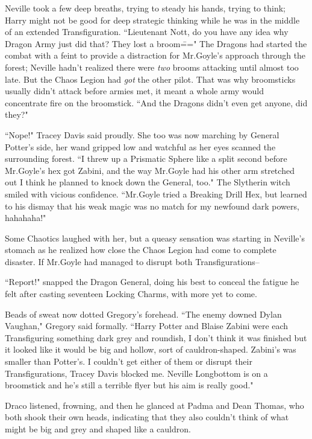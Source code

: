 Neville took a few deep breaths, trying to steady his hands, trying to think; Harry might not be good for deep strategic thinking while he was in the middle of an extended Transfiguration. ``Lieutenant Nott, do you have any idea why Dragon Army just did that? They lost a broom\===" The Dragons had started the combat with a feint to provide a distraction for Mr.\?Goyle's approach through the forest; Neville hadn't realized there were \emph{two} brooms attacking until almost too late. But the Chaos Legion had \emph{got} the other pilot. That was why broomsticks usually didn't attack before armies met, it meant a whole army would concentrate fire on the broomstick. ``And the Dragons didn't even get anyone, did they?"

``Nope!" Tracey Davis said proudly. She too was now marching by General Potter's side, her wand gripped low and watchful as her eyes scanned the surrounding forest. ``I threw up a Prismatic Sphere like a split second before Mr.\?Goyle's hex got Zabini, and the way Mr.\?Goyle had his other arm stretched out I think he planned to knock down the General, too." The Slytherin witch smiled with vicious confidence. ``Mr.\?Goyle tried a Breaking Drill Hex, but learned to his dismay that his weak magic was no match for my newfound dark powers, hahahaha!"

Some Chaotics laughed with her, but a queasy sensation was starting in Neville's stomach as he realized how close the Chaos Legion had come to complete disaster. If Mr.\?Goyle had managed to disrupt both Transfigurations\---

\later

``Report!" snapped the Dragon General, doing his best to conceal the fatigue he felt after casting seventeen Locking Charms, with more yet to come.

Beads of sweat now dotted Gregory's forehead. ``The enemy downed Dylan Vaughan," Gregory said formally. ``Harry Potter and Blaise Zabini were each Transfiguring something dark grey and roundish, I don't think it was finished but it looked like it would be big and hollow, sort of cauldron-shaped. Zabini's was smaller than Potter's. I couldn't get either of them or disrupt their Transfigurations, Tracey Davis blocked me. Neville Longbottom is on a broomstick and he's still a terrible flyer but his aim is really good."

Draco listened, frowning, and then he glanced at Padma and Dean Thomas, who both shook their own heads, indicating that they also couldn't think of what might be big and grey and shaped like a cauldron.


